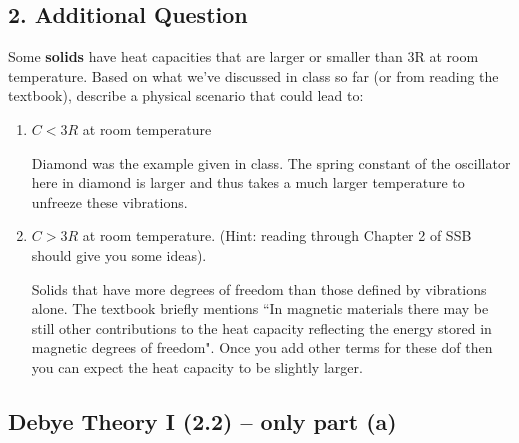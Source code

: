 \subsection*{2. Additional Question}
Some \textbf{solids} have heat capacities that are larger or smaller than 3R at room temperature. Based on what we’ve discussed in class so far (or from reading the textbook), describe a physical scenario that could lead to:
\begin{enumerate}[label=(\alph*)]
    \item $C<3R$ at room temperature

    \divider

    Diamond was the example given in class. The spring constant of the oscillator here in diamond is larger and thus takes a much larger temperature to unfreeze these vibrations.
    
    \item $C > 3R$ at room temperature. (Hint: reading through Chapter 2 of SSB should give you some ideas).

    \divider

    Solids that have more degrees of freedom than those defined by vibrations alone. The textbook briefly mentions ``In magnetic materials there may be still other contributions to the heat capacity reflecting the energy stored in magnetic degrees of freedom". Once you add other terms for these dof then you can expect the heat capacity to be slightly larger.

    
\end{enumerate}


\subsection{Debye Theory I (2.2) -- \textbf{only part (a)}}

